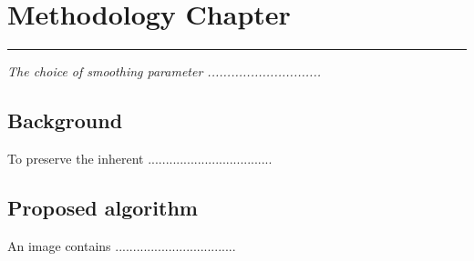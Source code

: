\chapter{Methodology Chapter}
\label{C3} %
\graphicspath{{Figures/Chapter-3figs/PDF/}{Figures/Chapter-3figs/}}
\noindent\rule{\linewidth}{2pt}
\textit{The choice of smoothing parameter .............................}
\section{Background}
To preserve the inherent \cite{deadd} ...................................
\section{Proposed algorithm}	
An image contains ..................................
